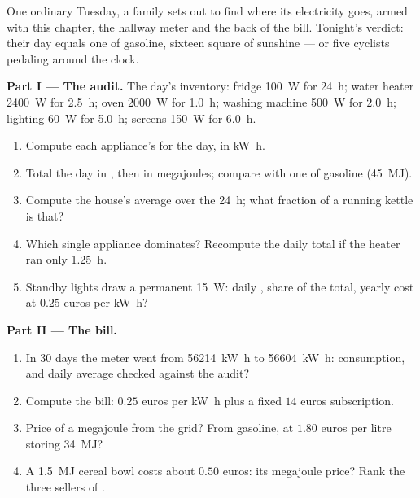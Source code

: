 \begin{problem}
\label{pb:g10:energy-conservation:1}
One ordinary Tuesday, a family sets out to find where its
electricity goes, armed with this chapter, the hallway meter and
the back of the bill. Tonight's verdict: their day equals one
 of gasoline, sixteen square  of sunshine --- or five
cyclists pedaling around the clock.

\medskip
\noindent\textbf{Part I --- The audit.}
The day's inventory: fridge \qty{100}{W} for \qty{24}{h}; water
heater \qty{2400}{W} for \qty{2.5}{h}; oven \qty{2000}{W} for
\qty{1.0}{h}; washing machine \qty{500}{W} for \qty{2.0}{h}; lighting
\qty{60}{W} for \qty{5.0}{h}; screens \qty{150}{W} for \qty{6.0}{h}.
\begin{enumerate}
  \item Compute each appliance's  for the day, in \unit{kW.h}.
  \item Total the day in , then in megajoules;
        compare with one  of gasoline (\qty{45}{MJ}).
  \item Compute the house's average  over the \qty{24}{h};
        what fraction of a running kettle is that?
  \item Which single appliance dominates? Recompute the daily total
        if the heater ran only \qty{1.25}{h}.
  \item Standby lights draw a permanent \qty{15}{W}: daily ,
        share of the total, yearly cost at $0.25$ euros per \unit{kW.h}?
\end{enumerate}

\medskip
\noindent\textbf{Part II --- The bill.}
\begin{enumerate}[resume]
  \item In 30 days the meter went from \qty{56214}{kW.h} to
        \qty{56604}{kW.h}: consumption, and daily average checked
        against the audit?
  \item Compute the bill: $0.25$ euros per \unit{kW.h} plus a
        fixed $14$ euros subscription.
  \item Price of a megajoule from the grid? From gasoline, at
        $1.80$ euros per litre storing \qty{34}{MJ}?
  \item A \qty{1.5}{MJ} cereal bowl costs about $0.50$ euros: its
        megajoule price? Rank the three sellers of .
\end{enumerate}


\end{problem}
